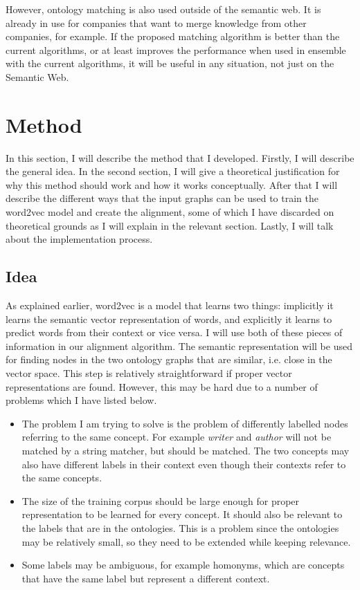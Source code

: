 \documentclass{article}
\begin{document}
 However, ontology matching is also used outside of the semantic web. It is already in use for companies that want to merge knowledge from other companies, for example. If the proposed matching algorithm is better than the current algorithms, or at least improves the performance when used in ensemble with the current algorithms, it will be useful in any situation, not just on the Semantic Web.

 \newpage
 \section{Method}
 In this section, I will describe the method that I developed. Firstly, I will describe the general idea. In the second section, I will give a theoretical justification for why this method should work and how it works conceptually. After that I will describe the different ways that the input graphs can be used to train the word2vec model and create the alignment, some of which I have discarded on theoretical grounds as I will explain in the relevant section. Lastly, I will talk about the implementation process.
 \subsection{Idea}
 As explained earlier, word2vec is a model that learns two things: implicitly it learns the semantic vector representation of words, and explicitly it learns to predict words from their context or vice versa. I will use both of these pieces of information in our alignment algorithm.
 The semantic representation will be used for finding nodes in the two ontology graphs that are similar, i.e. close in the vector space. This step is relatively straightforward if proper vector representations are found. However, this may be hard due to a number of problems which I have listed below.

 \begin{itemize}
  \item The problem I am trying to solve is the problem of differently labelled nodes referring to the same concept. For example \emph{writer} and \emph{author} will not be matched by a string matcher, but should be matched. The two concepts may also have different labels in their context even though their contexts refer to the same concepts.
  \item The size of the training corpus should be large enough for proper representation to be learned for every concept. It should also be relevant to the labels that are in the ontologies. This is a problem since the ontologies may be relatively small, so they need to be extended while keeping relevance.
  \item Some labels may be ambiguous, for example homonyms, which are concepts that have the same label but represent a different context.
 \end{itemize}
 
\end{document}
